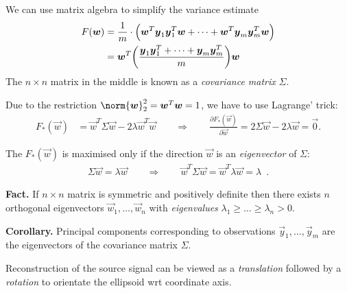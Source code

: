 \documentclass[landscape,footrule]{foils}
\begin{document}

We can use matrix algebra to simplify the variance estimate
\begin{align*}
F(\vec{w})&=\frac{1}{m}\cdot\Bigl(\vec{w}^T\vec{y}_1\vec{y}_1^T\vec{w}+\cdots+ \vec{w}^T\vec{y}_m\vec{y}_m^T\vec{w}\Bigr)\\
&=\vec{w}^T\biggl(\frac{\vec{y}_1\vec{y}_1^T+\cdots+\vec{y}_m\vec{y}_m^T}{m}\biggl)\vec{w}
\end{align*}
The $n\times n$ matrix in the middle is known as a \emph{covariance matrix} $\Sigma$.
\vspace*{1cm}

Due to the restriction $\norm{\vec{w}}_2^2=\vec{w}^T\vec{w}=1$, we have to use Lagrange' trick: 
\begin{align*}
F_*(\vec{w})&=\vec{w}^T\Sigma\vec{w}-2\lambda\vec{w}^T\vec{w}
\qquad \Rightarrow\qquad 
\frac{\partial F_*(\vec{w})}{\partial \vec{w}}=2\Sigma\vec{w}- 2\lambda\vec{w}=\vec{0}.
\end{align*}


The $F_*(\vec{w})$ is maximised only if the direction $\vec{w}$ is an \emph{eigenvector} of $\Sigma$:
\begin{align*}
\Sigma\vec{w}=\lambda\vec{w}\qquad\Rightarrow\qquad \vec{w}^T\Sigma\vec{w}=\vec{w}^T\lambda\vec{w}=\lambda\enspace.
\end{align*}

\textbf{Fact.} If $n\times n$ matrix is symmetric and positively definite then there exists 
$n$ orthogonal eigenvectors $\vec{w}_1,\ldots,\vec{w}_n$ with \emph{eigenvalues} $\lambda_1\geq \ldots\geq\lambda_n>0$. \vspace*{0.5cm}

\textbf{Corollary.} Principal components corresponding to observations $\vec{y}_1,\ldots,\vec{y}_m$ are the eigenvectors of the covariance matrix $\Sigma$. 



Reconstruction of the source signal can be viewed as a \emph{translation} followed by a \emph{rotation} to orientate the ellipsoid wrt coordinate axis.
\end{document}
